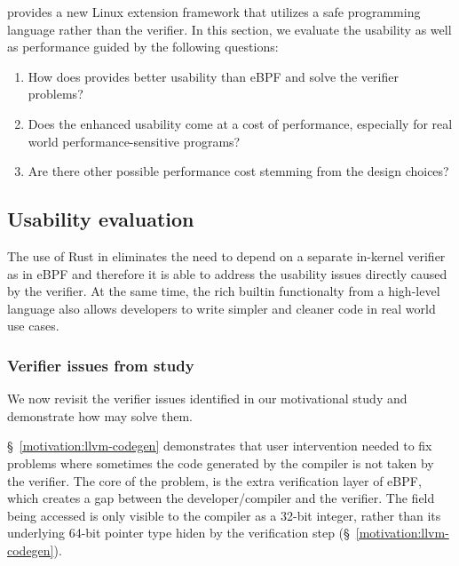 \projname{} provides a new Linux extension framework that utilizes a safe
    programming language rather than the verifier.
In this section, we evaluate the usability as well as performance guided by the
    following questions:
\begin{enumerate}
    \item How does \projname{} provides better usability than eBPF and solve the
        verifier problems?
    \item Does the enhanced usability come at a cost of performance, especially
        for real world performance-sensitive programs?
    \item Are there other possible performance cost stemming from the design
        choices?
\end{enumerate}

\subsection{Usability evaluation}
The use of Rust in \projname{} eliminates the need to depend on a separate
    in-kernel verifier as in eBPF and therefore it is able to address the
    usability issues directly caused by the verifier.
At the same time, the rich builtin functionalty from a high-level language also
    allows developers to write simpler and cleaner code in real world use cases.

\subsubsection{Verifier issues from study}
We now revisit the verifier issues identified in our motivational study and
    demonstrate how \projname{} may solve them.

 \S~\ref{motivation:llvm-codegen} demonstrates that
    user intervention needed to fix problems where sometimes the code generated
    by the compiler is not taken by the verifier.
The core of the problem, is the extra verification layer of eBPF, which creates
    a gap between the developer/compiler and the verifier.
The field being accessed is only visible to the compiler as a 32-bit integer,
    rather than its underlying 64-bit pointer type hiden by the verification
    step (\S~\ref{motivation:llvm-codegen}).

